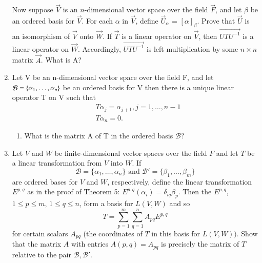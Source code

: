 \begin{enumerate}[label=\thesubsection.\arabic*.,ref=\thesubsection.\theenumi]
Now suppose $\vec{V}$ is an $n$-dimensional vector space over the field $\vec{F}$, and let $\beta$ be an ordered basis for $\vec{V}$. For each $\alpha$ in $\vec{V}$, define $\vec{U}_{\alpha}$ = $[\alpha]_{\beta}$. Prove that $\vec{U}$ is an isomorphism of $\vec{V}$ onto $\vec{W}$. If $\vec{T}$ is a linear operator on $\vec{V}$, then $\vec{UTU^{-1}}$ is a linear operator on $\vec{W}$. Accordingly, $\vec{UTU^{-1}}$ is left multiplication by some $n \times n$ matrix $\vec{A}$.
What is A?
%
\\
\solution

\item Let V be an n-dimensional vector space over the field F, and let $\mathcal{B} = \left\{\alpha_1,\ldots, \alpha_n\right\}$ be an ordered basis for V then there is a unique linear operator T on V such that 
\begin{align}
   &T\alpha_{j} = \alpha_{j+1},  j=1,\ldots,n-1 \\
   &T\alpha_n = 0. 
\end{align}
%
\begin{enumerate}
\item What is the matrix A of T in the ordered basis $\mathcal{B}$?
\\
\solution

\end{enumerate}
\item Let $V$ and $W$ be finite-dimensional vector spaces over the field $F$ and let $T$ be a linear transformation from $V$ into $W$. If
\begin{equation}
	\mathcal{B} = \{\alpha_1, \dots, \alpha_n\} \text{ and } \mathcal{B}' = \{\beta_1, \dots, \beta_m\}
\end{equation}
are ordered bases for $V$ and $W$, respectively, define the linear transformation $E^{p,q}$ as in the proof of Theorem 5: $E^{p,q}(\alpha_i) = \delta_{iq}\beta_p$. Then the $E^{p,q}$, $1 \leq p \leq m$, $1 \leq q \leq n$, form a basis for $L(V,W)$ and so
\begin{equation}
	T = \displaystyle \sum_{p=1}^m \displaystyle \sum_{q=1}^n A_{pq}E^{p,q}
\end{equation} 
for certain scalars $A_{pq}$ (the coordinates of $T$ in this basis for $L(V,W))$. Show that the matrix $A$ with entries $A(p,q) = A_{pq}$ is precisely the matrix of $T$ relative to the pair $\mathcal{B},\mathcal{B}'$.
%
\\
\solution


\end{enumerate}

